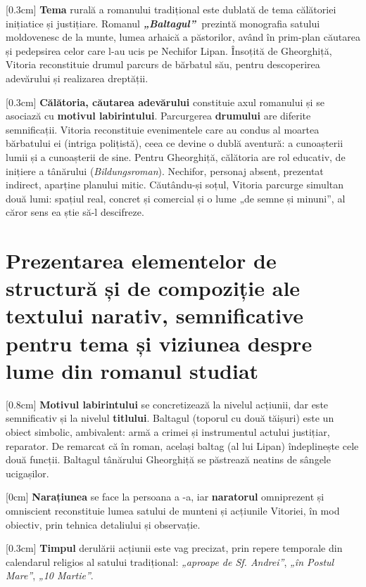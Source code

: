 \documentclass[
12pt,
a4paper
]{article}
\newcommand{\rom}[1]{\uppercase\expandafter{\romannumeral #1\relax}} %
\newcommand{\operatitle}{\textbf{\textit{„Baltagul”\ }}} %
\begin{document}
[0.3cm]
\textbf{Tema} rurală a romanului tradițional este dublată de tema călătoriei inițiatice și justițiare. Romanul \operatitle prezintă monografia satului moldovenesc de la munte, lumea arhaică a păstorilor, având în prim-plan căutarea și pedepsirea celor care l-au ucis pe Nechifor Lipan. Însoțită de Gheorghiță, Vitoria reconstituie drumul parcurs de bărbatul său, pentru descoperirea adevărului și realizarea dreptății.

[0.3cm]
\textbf{Călătoria, căutarea adevărului} constituie axul romanului și se asociază cu \textbf{motivul labirintului}. Parcurgerea \textbf{drumului} are diferite semnificații. Vitoria reconstituie evenimentele care au condus al moartea bărbatului ei (intriga polițistă), ceea ce devine o dublă aventură: a cunoașterii lumii și a cunoașterii de sine. Pentru Gheorghiță, călătoria are rol educativ, de inițiere a tânărului (\textit{Bildungsroman}). Nechifor, personaj absent, prezentat indirect, aparține planului mitic. Căutându-și soțul, Vitoria parcurge simultan două lumi: spațiul real, concret și comercial și o lume „de semne și minuni”, al căror sens ea știe să-l descifreze.

\section{Prezentarea elementelor de structură și de compoziție ale textului narativ, semnificative pentru tema și viziunea despre lume din romanul studiat} %

[0.8cm]
\textbf{Motivul labirintului} se concretizează la nivelul acțiunii, dar este semnificativ și la nivelul \textbf{titlului}. Baltagul (toporul cu două tăișuri) este un obiect simbolic, ambivalent: armă a crimei și instrumentul actului justițiar, reparator. De remarcat că în roman, același baltag (al lui Lipan) îndeplinește cele două funcții. Baltagul tânărului Gheorghiță se păstrează neatins de sângele ucigașilor.

[0cm]
\textbf{Narațiunea} se face la persoana a \rom{3}-a, iar \textbf{naratorul} omniprezent și omniscient reconstituie lumea satului de munteni și acțiunile Vitoriei, în mod obiectiv, prin tehnica detaliului și observație.

[0.3cm]
\textbf{Timpul} derulării acțiunii este vag precizat, prin repere temporale din calendarul religios al satului tradițional: \textit{„aproape de Sf. Andrei”}, \textit{„în Postul Mare”}, \textit{„10 Martie”}.
\end{document}
